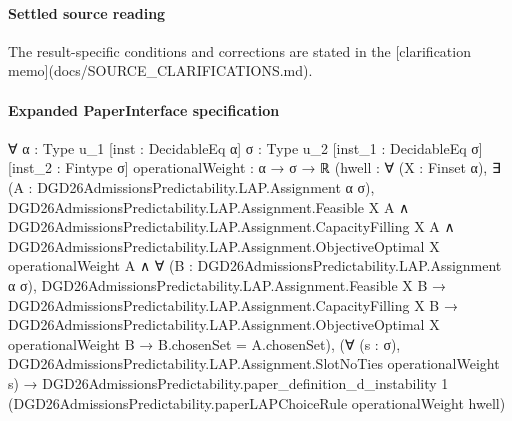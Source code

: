 \documentclass[10pt]{article}
\begin{document}
\paragraph{Settled source reading}
The result-\allowbreak{}specific conditions and corrections are stated in the [clarification memo](docs/\allowbreak{}SOURCE\_\allowbreak{}CLARIFICATIONS.\allowbreak{}md).\allowbreak{}

\paragraph{Expanded PaperInterface specification}
\begin{ReviewVerbatim}
∀ {α : Type u_1} [inst : DecidableEq α] {σ : Type u_2} [inst_1 : DecidableEq σ] [inst_2 : Fintype σ]
  {operationalWeight : α → σ → ℝ}
  (hwell :
    ∀ (X : Finset α),
      ∃ (A : DGD26AdmissionsPredictability.LAP.Assignment α σ),
        DGD26AdmissionsPredictability.LAP.Assignment.Feasible X A ∧
          DGD26AdmissionsPredictability.LAP.Assignment.CapacityFilling X A ∧
            DGD26AdmissionsPredictability.LAP.Assignment.ObjectiveOptimal X operationalWeight A ∧
              ∀ (B : DGD26AdmissionsPredictability.LAP.Assignment α σ),
                DGD26AdmissionsPredictability.LAP.Assignment.Feasible X B →
                  DGD26AdmissionsPredictability.LAP.Assignment.CapacityFilling X B →
                    DGD26AdmissionsPredictability.LAP.Assignment.ObjectiveOptimal X operationalWeight B →
                      B.chosenSet = A.chosenSet),
  (∀ (s : σ), DGD26AdmissionsPredictability.LAP.Assignment.SlotNoTies operationalWeight s) →
    DGD26AdmissionsPredictability.paper_definition_d_instability 1
      (DGD26AdmissionsPredictability.paperLAPChoiceRule operationalWeight hwell)
\end{ReviewVerbatim}
\end{document}
